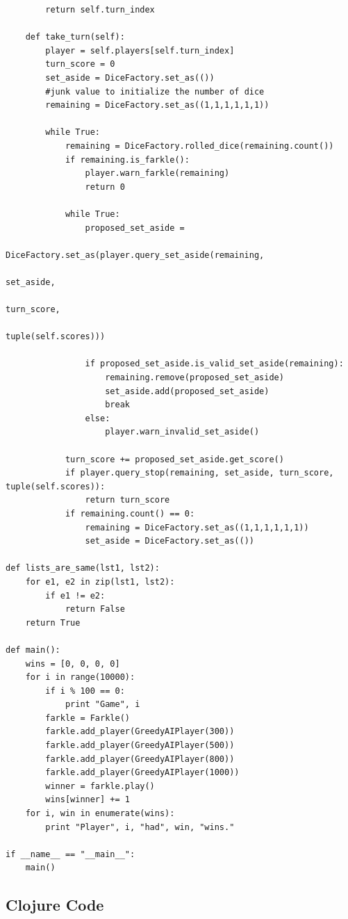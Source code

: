 \documentclass{article}
\begin{document}
\begin{lstlisting}
        return self.turn_index

    def take_turn(self):
        player = self.players[self.turn_index]
        turn_score = 0
        set_aside = DiceFactory.set_as(())
        #junk value to initialize the number of dice
        remaining = DiceFactory.set_as((1,1,1,1,1,1))

        while True:
            remaining = DiceFactory.rolled_dice(remaining.count())
            if remaining.is_farkle():
                player.warn_farkle(remaining)
                return 0

            while True:
                proposed_set_aside =
                    DiceFactory.set_as(player.query_set_aside(remaining,
                                                              set_aside,
                                                              turn_score,
                                                              tuple(self.scores)))

                if proposed_set_aside.is_valid_set_aside(remaining):
                    remaining.remove(proposed_set_aside)
                    set_aside.add(proposed_set_aside)
                    break
                else:
                    player.warn_invalid_set_aside()

            turn_score += proposed_set_aside.get_score()
            if player.query_stop(remaining, set_aside, turn_score, tuple(self.scores)):
                return turn_score
            if remaining.count() == 0:
                remaining = DiceFactory.set_as((1,1,1,1,1,1))
                set_aside = DiceFactory.set_as(())

def lists_are_same(lst1, lst2):
    for e1, e2 in zip(lst1, lst2):
        if e1 != e2:
            return False
    return True

def main():
    wins = [0, 0, 0, 0]
    for i in range(10000):
        if i % 100 == 0:
            print "Game", i
        farkle = Farkle()
        farkle.add_player(GreedyAIPlayer(300))
        farkle.add_player(GreedyAIPlayer(500))
        farkle.add_player(GreedyAIPlayer(800))
        farkle.add_player(GreedyAIPlayer(1000))
        winner = farkle.play()
        wins[winner] += 1
    for i, win in enumerate(wins):
        print "Player", i, "had", win, "wins."

if __name__ == "__main__":
    main()
\end{lstlisting}

\subsection{Clojure Code}
\end{document}
